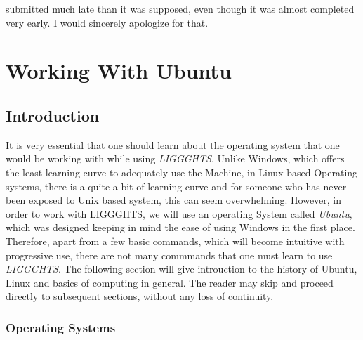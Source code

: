 \documentclass{tufte-book} %
\newcommand{\Li}{\textit{LIGGGHTS}\xspace}
\begin{document}
  submitted much late than it was supposed, even though it was almost completed very early. I would sincerely apologize for that. 

    
    
 



\mainmatter


\chapter{Working With Ubuntu}
\label{ch:1}


\section{Introduction}

\begin{fullwidth}
  It is very essential that one should learn about the operating system that one would be working with while using \textsc{\Li}. Unlike Windows, which offers the least learning curve to adequately use the Machine, in Linux-based Operating systems, there is a quite a bit of learning curve and for someone who has never been exposed to Unix based system, this can seem overwhelming. However, in order to work with \textsc{LIGGGHTS}, we will use an operating System called \emph{Ubuntu}, which was designed keeping in mind the ease of using Windows in the first place. Therefore, apart from a few basic commands, which will become intuitive with progressive use, there are not many commmands that one must learn to use \textsc{\Li}. The following section will give introuction to the history of Ubuntu, Linux and basics of computing in general. The reader may skip and proceed directly to subsequent sections, without any loss of continuity.
\end{fullwidth}
\subsection{Operating Systems}
\end{document}
